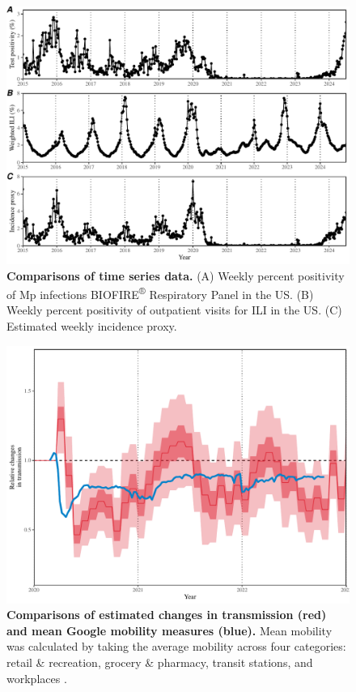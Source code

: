 \documentclass[12pt]{article}
\begin{document}
\begin{figure}[!ht]
\includegraphics[width=\textwidth]{../figure_timeseries/figure_timeseries.pdf}
\caption{
\textbf{Comparisons of time series data.}
(A) Weekly percent positivity of Mp infections BIOFIRE\textsuperscript{®} Respiratory Panel in the US.
(B) Weekly percent positivity of outpatient visits for ILI in the US.
(C) Estimated weekly incidence proxy.
}
\end{figure}

\pagebreak

\begin{figure}[!ht]
\includegraphics[width=\textwidth]{../figure_mobility/figure_mobility_new.pdf}
\caption{
\textbf{Comparisons of estimated changes in transmission (red) and mean Google mobility measures (blue).}
Mean mobility was calculated by taking the average mobility across four categories: retail \& recreation, grocery \& pharmacy, transit stations, and workplaces \citep{park2024predicting}.
}
\end{figure}
\end{document}
